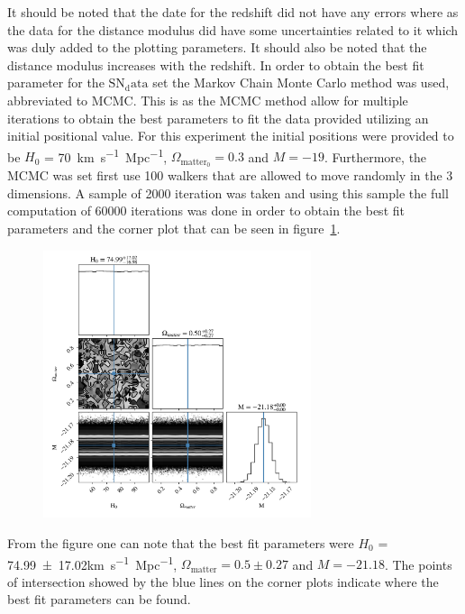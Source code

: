 \documentclass[12pt, a4paper]{article}
\begin{document}
It should be noted that the date for the redshift did not have any errors where as the data for the distance modulus did have some uncertainties related to it which was duly added to the plotting parameters. It should also be noted that the distance modulus increases with the redshift. In order to obtain the best fit parameter for the \(\mathrm{SN_data}\) set the Markov Chain Monte Carlo method was used, abbreviated to MCMC. This is as the MCMC method allow for multiple iterations to obtain the best parameters to fit the data provided utilizing an initial positional value. For this experiment the initial positions were provided to be \(H_0\) = \qty{70}{km.s^{-1}.Mpc^{-1}}, \(\Omega_{\mathrm{matter_0}} = 0.3\) and \(M=-19\). Furthermore, the MCMC was set first use 100 walkers that are allowed to move randomly in the 3 dimensions. A sample of 2000 iteration was taken and using this sample the full computation of 60000 iterations was done in order to obtain the best fit parameters and the corner plot that can be seen in figure~\ref{fig:corner~plots}. 

\begin{figure}[H]
    \centering
    \includegraphics[width = 0.7\textwidth]{Graph 4.png}
    \label{fig:corner~plots}
\end{figure}

From the figure one can note that the best fit parameters were \(H_0\) = \num{74.99 \pm 17.02}\unit{km.s^{-1}.Mpc^{-1}}, \(\Omega_{\mathrm{matter}} = 0.5 \pm 0.27\) and \(M = -21.18\). The points of intersection showed by the blue lines on the corner plots indicate where the best fit parameters can be found. 
\end{document}
